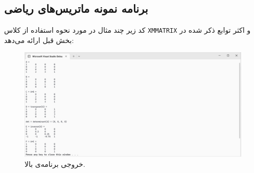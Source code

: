 \subsection{\textbf{برنامه نمونه ماتریس‌های ریاضی }}
\label{subsec:2.8.3}
{
    \Large
    \begin{spacing}{1.5}
        کد زیر چند مثال در مورد نحوه استفاده از کلاس \texttt{XMMATRIX} و اکثر توابع ذکر شده در بخش قبل ارائه می‌دهد:
        \textbf{\vspace{6pt}}
        \lr{}
        \textbf{\vspace{6pt}}

        \begin{figure}[H]
            \centering
            \setlength{\belowcaptionskip}{-10pt}
            \includegraphics[width=\textwidth]{Images/4/2/4.Session.1.2.1}
            \caption {خروجی برنامه‌ی بالا.}
            \label{fig:4.Session.1.2.1}
        \end{figure}
    \end{spacing}
}
\newpage


